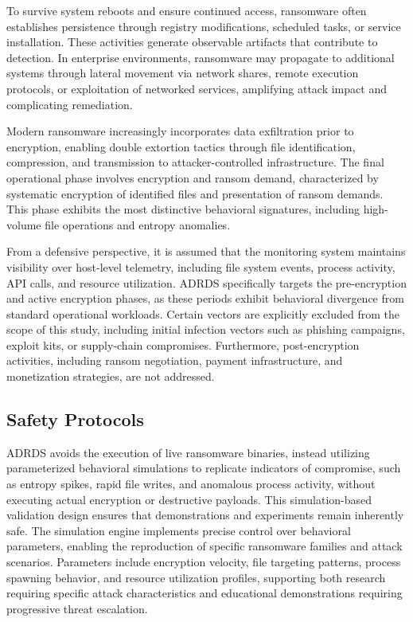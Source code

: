 To survive system reboots and ensure continued access, ransomware often establishes persistence through registry modifications, scheduled tasks, or service installation. These activities generate observable artifacts that contribute to detection. In enterprise environments, ransomware may propagate to additional systems through lateral movement via network shares, remote execution protocols, or exploitation of networked services, amplifying attack impact and complicating remediation.

Modern ransomware increasingly incorporates data exfiltration prior to encryption, enabling double extortion tactics through file identification, compression, and transmission to attacker-controlled infrastructure. The final operational phase involves encryption and ransom demand, characterized by systematic encryption of identified files and presentation of ransom demands. This phase exhibits the most distinctive behavioral signatures, including high-volume file operations and entropy anomalies.

From a defensive perspective, it is assumed that the monitoring system maintains visibility over host-level telemetry, including file system events, process activity, API calls, and resource utilization. ADRDS specifically targets the pre-encryption and active encryption phases, as these periods exhibit behavioral divergence from standard operational workloads. Certain vectors are explicitly excluded from the scope of this study, including initial infection vectors such as phishing campaigns, exploit kits, or supply-chain compromises. Furthermore, post-encryption activities, including ransom negotiation, payment infrastructure, and monetization strategies, are not addressed.

\subsection{Safety Protocols}

ADRDS avoids the execution of live ransomware binaries, instead utilizing parameterized behavioral simulations to replicate indicators of compromise, such as entropy spikes, rapid file writes, and anomalous process activity, without executing actual encryption or destructive payloads. This simulation-based validation design ensures that demonstrations and experiments remain inherently safe. The simulation engine implements precise control over behavioral parameters, enabling the reproduction of specific ransomware families and attack scenarios. Parameters include encryption velocity, file targeting patterns, process spawning behavior, and resource utilization profiles, supporting both research requiring specific attack characteristics and educational demonstrations requiring progressive threat escalation.


